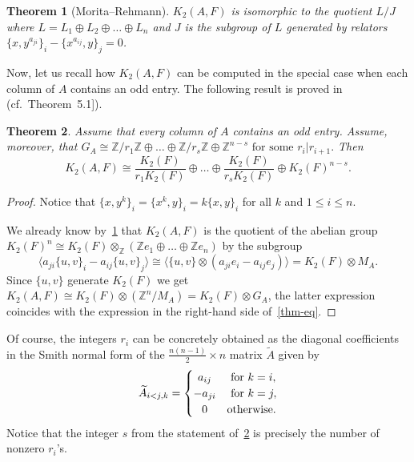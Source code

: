 \documentclass[oneside, 10pt]{amsart}
\theoremstyle{plain}
\newtheorem{thm}{Theorem}
\theoremstyle{remark}
\theoremstyle{definition}
\newcommand{\K}{K_2}
\begin{document}
\begin{thm}[Morita--Rehmann] \label{thm:mr} 
 $\K(A, F)$ is isomorphic to the quotient $L/J$ where $L = L_1 \oplus L_2 \oplus \ldots \oplus L_n$ and 
 $J$ is the subgroup of $L$ generated by relators $\{x, y^{a_{ji}}\}_i - \{x^{a_{ij}}, y\}_j = 0$.
\end{thm}

Now, let us recall how $\K(A, F)$ can be computed in the special case when each column of $A$ contains an odd entry.
The following result is proved in~\cite{MW} (cf.~Theorem~5.1]).
\begin{thm} \label{thm-odd}
  Assume that every column of $A$ contains an odd entry. Assume, moreover, that
  $G_A \cong \mathbb{Z}/r_1\mathbb{Z} \oplus \ldots \oplus \mathbb{Z}/r_s\mathbb{Z} \oplus \mathbb{Z}^{n-s}\text{ for some } r_i | r_{i+1}.$
  Then 
  \begin{equation} \label{thm-eq}
    \K(A, F) \cong \frac{\K(F)}{r_1 \K(F)} \oplus \ldots \oplus \frac{\K(F)}{r_s \K(F)} \oplus \K(F)^{n-s}.
  \end{equation}
\end{thm}
\begin{proof}
 Notice that $\{x, y^k\}_i = \{x^k, y\}_i = k\{x,y\}_i$ for all $k$ and $1\leq i\leq n$.
 
 We already know by~\cref{thm:mr} that $\K(A, F)$ is the quotient of the abelian group 
  $\K(F)^n \cong \K(F) \otimes_{\mathbb{Z}} (\mathbb{Z}e_1 \oplus \ldots \oplus \mathbb{Z}e_n)$ by the subgroup
  \[\langle a_{ji}\{u, v\}_i - a_{ij}\{u, v\}_j \rangle \cong \langle \{u, v\} \otimes (a_{ji} e_i - a_{ij} e_j)\rangle = \K(F) \otimes M_A. \]
 Since $\{u, v\}$ generate $\K(F)$ we get $\K(A, F) \cong \K(F) \otimes (\mathbb{Z}^n / M_A) = \K(F) \otimes G_A$,
  the latter expression coincides with the expression in the right-hand side of~\eqref{thm-eq}. 
\end{proof}

Of course, the integers $r_i$ can be concretely obtained as
  the diagonal coefficients in the Smith normal form of the $\frac{n(n-1)}{2}\times n$ matrix $\widetilde{A}$ given by
\begin{equation} \label{eq:Aijk} \widetilde{A}_{i<j, k} = \left\{\def\arraystretch{1.2}%
  \begin{array}{@{}c@{\quad}l@{}}
     a_{ij} & \text{ for } k = i, \\
    -a_{ji} & \text{ for } k = j, \\
    0 & \text{otherwise.}    
  \end{array}\right.\end{equation}                    
Notice that the integer $s$ from the statement of~\cref{thm-odd} is precisely the number of nonzero $r_i$'s.
  
\end{document}
